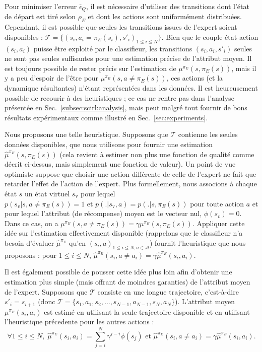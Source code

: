 \documentclass[english,utf8]{./hermes-journal}
\newcommand{\A}{\mathcal{A}}
\newcommand{\T}{\mathcal{T}}
\begin{document}
Pour minimiser l'erreur $\bar{\epsilon}_Q$, il est nécessaire d'utiliser des transitions dont l'état de départ est tiré selon 
$\rho_E$ et dont les actions sont uniformément distribuées. Cependant, il est possible que seules les transitions issues de l'expert soient disponibles : $\T =
\{(s_i,a_i=\pi_E(s_i),s'_i)_{1\leq i \leq N}\}$. Bien que le couple état-action $(s_i,a_i)$ puisse être exploité par le classifieur, les transitions $(s_i,a_i,s'_i)$ seules ne sont pas seules suffisantes pour une estimation précise de l'attribut moyen. Il est toujours possible de rester précis sur l'estimation de $\mu^{\pi_E}(s,\pi_E(s))$, mais il y a peu d'espoir de l'être pour $\mu^{\pi_E}(s,a\neq\pi_E(s))$, ces actions (et la dynamique résultantes) n'étant représentées dans les données. Il est heureusement possible de recourir à des heuristiques ; ce cas ne rentre pas dans l'analyse présentée en 
Sec.~\ref{subsec:scirl:analysis}, mais peut malgré tout fournir de bons résultats expérimentaux comme illustré en Sec.~\ref{sec:experiments}.


Nous proposons une telle heuristique. Supposons que  $\T$ contienne les seules données disponibles, que nous utilisons pour fournir une estimation 
$\hat{\mu}^{\pi_E}(s,\pi_E(s))$ (cela revient à estimer non plus une fonction de qualité comme décrit ci-dessus, mais simplement une fonction de valeur). Un point de vue optimiste suppose que choisir une action différente de celle de l'expert ne fait que retarder l'effet de l'action de l'expert. Plus formellement, nous associons à chaque état $s$ un état virtuel $s_\text{v}$ pour lequel $p(s_v|s,a\neq \pi_E(s))=1 \textrm{ et } p(.|s_\text{v},a)=p(.|s,\pi_E(s))$ pour toute action $a$ et pour lequel l'attribut (de récompense) moyen est le vecteur nul, $\phi(s_v) = 0$. Dans ce cas, on a
$\mu^{\pi_E}(s,a\neq\pi_E(s)) = \gamma \mu^{\pi_E}(s,\pi_E(s))$.
Appliquer cette idée sur l'estimation effectivement disponible (rappelons que le classifieur n'a besoin d'évaluer  $\hat{\mu}^{\pi_E}$ qu'en
$(s_i,a)_{1\leq i\leq N,a\in \A}$) fournit l'heuristique que nous proposons :
pour $1\leq i\leq N$, $\hat{\mu}^{\pi_E}(s_i,a\neq a_i) = \gamma
\hat{\mu}^{\pi_E}(s_i,a_i)$.

Il est également possible de pousser cette idée plus loin afin d'obtenir une estimation plus simple (mais offrant de moindres garanties) de l'attribut moyen de l'expert.
Supposons que  $\T$ consiste en une longue trajectoire, c'est-à-dire
$s'_i = s_{i+1}$ (donc $\T =
\{s_1,a_1,s_2,\dots,s_{N-1},a_{N-1},s_N,a_N\}$). L'attribut moyen 
$\mu^{\pi_E}(s_i,a_i)$ est estimé en utilisant la seule trajectoire disponible et en utilisant l'heuristique précedente pour les autres actions :
\begin{equation}
  \forall 1\leq i \leq N,\; \hat{\mu}^{\pi_E}(s_i,a_i) =
  \sum_{j=i}^N \gamma^{j-i}\phi(s_j) \text{ et }
  \hat{\mu}^{\pi_E}(s_i,a\neq a_i) = \gamma
  \hat{\mu}^{\pi_E}(s_i,a_i).
  \label{eq:mc_plus_heuristic}
\end{equation}
\end{document}
